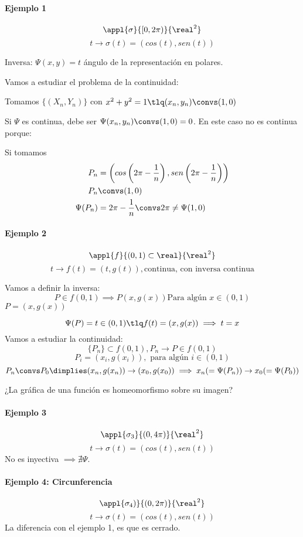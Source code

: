 \paragraph{Ejemplo 1}

\[\appl{\sigma}{[0,2\pi)}{\real^2}\]
\[t \rightarrow \sigma(t) = (cos(t),sen(t))\]

Inversa: $\Psi(x,y) = t$ ángulo de la representación en polares.

Vamos a estudiar el problema de la continuidad:

Tomamos $\{(X_n,Y_n)\}$ con $x^2+y^2 = 1 \tlq (x_n,y_n) \convs (1,0)$

Si $\Psi$ es continua, debe ser $\Psi(x_n,y_n) \convs (1,0) = 0$. En este caso no es continua porque:

Si tomamos \begin{align*}
P_n &= \left(cos\left(2\pi - \frac{1}{n}\right), sen\left(2\pi - \frac{1}{n}\right) \right)\\
P_n &\convs (1,0)\\
\Psi(P_n) &= 2\pi - \frac{1}{n} \convs 2\pi\neq\Psi(1,0)
\end{align*}

\paragraph{Ejemplo 2}

\[\appl{f}{(0,1)\subset\real}{\real^2}\]
\[t \rightarrow f(t) = (t,g(t)), \text{continua, con inversa continua}\]

Vamos a definir la  inversa:
\[P\in f(0,1) \implies P(x,g(x)) \text{Para algún } x\in(0,1)\]
$P = (x,g(x))$

\[\Psi(P) = t \in (0,1) \tlq f(t) = (x,g(x)) \implies t = x\]
Vamos a estudiar la continuidad:
\[\{P_n\} \subset f(0,1), P_n \rightarrow P \in f(0,1)\]
\[P_i = (x_i,g(x_i)), \text{ para algún } i \in (0,1)\]
\[P_n \convs P_0 \dimplies (x_n,g(x_n)) \rightarrow (x_0,g(x_0)) \implies x_n (= \Psi(P_n)) \rightarrow x_0 (=\Psi(P_0)) \]

\obs ¿La gráfica de una función es homeomorfismo sobre su imagen?
\paragraph{Ejemplo 3}
\[\appl{\sigma_3}{(0,4\pi)}{\real^2}\]
\[t \rightarrow \sigma(t) = (cos(t),sen(t))\]
No es inyectiva $\implies \nexists \Psi$.

\paragraph{Ejemplo 4: Circunferencia}
\[\appl{\sigma_4)}{(0,2\pi)}{\real^2}\]
\[t \rightarrow \sigma(t) = (cos(t),sen(t))\]
La diferencia con el ejemplo 1, es que es cerrado.

